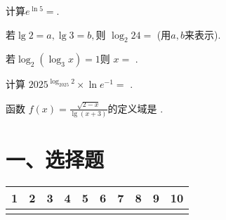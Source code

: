 \documentclass{exam-zh}
\begin{document}
        \begin{question}
          计算$e^{\ln 5} = $\fillin[$5$].
        \end{question}


        \begin{question}
          若$\lg 2 =a , \lg 3 = b ,$则 $\log_2 24 = $    (用$a,b$来表示).
        \end{question}

        \begin{question}
          若$\log_2(\log_3 x) = 1 $则 $x = $    \fillin[$9$].
        \end{question}


        \begin{question}
          计算 $2025^{\log_{2025}2} \times \ln e^{-1}=$      \fillin[$-2$].
        \end{question}
        \begin{question}
         函数 $f(x) = \frac{\sqrt{2-x}}{\lg(x+3)}$的定义域是  \fillin[$(-3,-2) \cup {( -2,2]}$].
        \end{question}




\section*{一、选择题}
\begin{table}[h]
\centering
\begin{tabular}{|C|C|C|C|C|C|C|C|C|C|}
   & 2 & 3 & 4 & 5 & 6 & 7 & 8 & 9 & 10 \\
  \hline
    &   &   &   &   &   &   &   &   &    \\
  \hline
\end{tabular}
\end{table}


\end{document}
